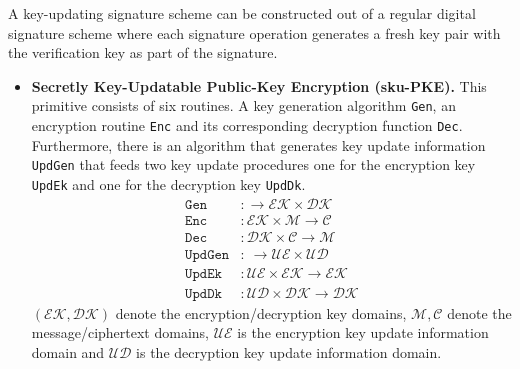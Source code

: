 \documentclass[11pt,a4paper,twoside,openright,bibliography=totoc]{scrbook}
\begin{document}
A key-updating signature scheme can be constructed out of a regular
digital signature scheme where each signature operation generates
a fresh key pair with the verification key as part of the signature.

\begin{itemize}
\item \textbf{Secretly Key-Updatable Public-Key Encryption (sku-PKE).} This
  primitive consists of six routines. A key generation algorithm \texttt{Gen},
  an encryption routine \texttt{Enc} and its corresponding decryption function
  \texttt{Dec}. Furthermore, there is an algorithm that generates key update
  information \texttt{UpdGen} that feeds two key update procedures
  one for the encryption key \texttt{UpdEk} and one for the
  decryption key \texttt{UpdDk}.
  \begin{align*}
    \texttt{Gen} & : \rightarrow \mathcal{EK} \times \mathcal{DK} \\
    \texttt{Enc} & : \mathcal{EK} \times \mathcal{M} \rightarrow \mathcal{C} \\
    \texttt{Dec} & : \mathcal{DK} \times \mathcal{C} \rightarrow \mathcal{M} \\
    \texttt{UpdGen} & : \ \rightarrow \mathcal{UE} \times \mathcal{UD} \\
    \texttt{UpdEk} & : \mathcal{UE} \times \mathcal{EK} \rightarrow \mathcal{EK} \\
    \texttt{UpdDk} & :  \mathcal{UD} \times \mathcal{DK} \rightarrow \mathcal{DK}
  \end{align*}
  $(\mathcal{EK},\mathcal{DK})$ denote the encryption/decryption key domains,
  $\mathcal{M},\mathcal{C}$ denote the message/ciphertext domains, $\mathcal{UE}$
  is the encryption key update information domain and $\mathcal{UD}$ is the
  decryption key update information domain.
\end{itemize}
\end{document}
